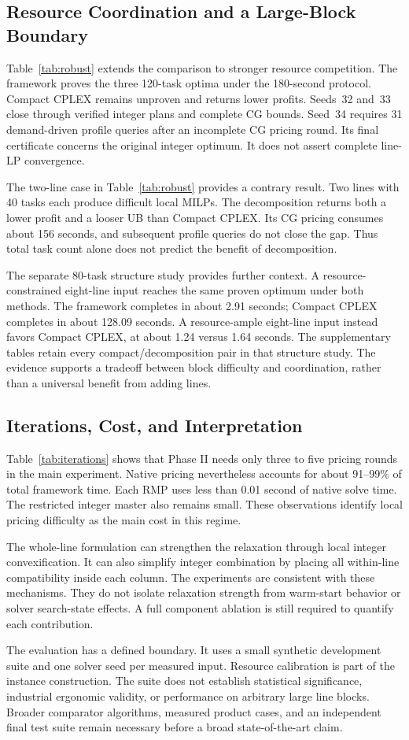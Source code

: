 \subsection{Resource Coordination and a Large-Block Boundary}

Table~\ref{tab:robust} extends the comparison to stronger resource competition. The framework proves the three 120-task optima under the 180-second protocol. Compact CPLEX remains unproven and returns lower profits. Seeds~32 and~33 close through verified integer plans and complete CG bounds. Seed~34 requires 31 demand-driven profile queries after an incomplete CG pricing round. Its final certificate concerns the original integer optimum. It does not assert complete line-LP convergence.

The two-line case in Table~\ref{tab:robust} provides a contrary result. Two lines with 40 tasks each produce difficult local MILPs. The decomposition returns both a lower profit and a looser UB than Compact CPLEX. Its CG pricing consumes about 156 seconds, and subsequent profile queries do not close the gap. Thus total task count alone does not predict the benefit of decomposition.

The separate 80-task structure study provides further context. A resource-constrained eight-line input reaches the same proven optimum under both methods. The framework completes in about 2.91 seconds; Compact CPLEX completes in about 128.09 seconds. A resource-ample eight-line input instead favors Compact CPLEX, at about 1.24 versus 1.64 seconds. The supplementary tables retain every compact/decomposition pair in that structure study. The evidence supports a tradeoff between block difficulty and coordination, rather than a universal benefit from adding lines.

\subsection{Iterations, Cost, and Interpretation}

Table~\ref{tab:iterations} shows that Phase II needs only three to five pricing rounds in the main experiment. Native pricing nevertheless accounts for about 91--99\% of total framework time. Each RMP uses less than 0.01 second of native solve time. The restricted integer master also remains small. These observations identify local pricing difficulty as the main cost in this regime.

The whole-line formulation can strengthen the relaxation through local integer convexification. It can also simplify integer combination by placing all within-line compatibility inside each column. The experiments are consistent with these mechanisms. They do not isolate relaxation strength from warm-start behavior or solver search-state effects. A full component ablation is still required to quantify each contribution.

The evaluation has a defined boundary. It uses a small synthetic development suite and one solver seed per measured input. Resource calibration is part of the instance construction. The suite does not establish statistical significance, industrial ergonomic validity, or performance on arbitrary large line blocks. Broader comparator algorithms, measured product cases, and an independent final test suite remain necessary before a broad state-of-the-art claim.
